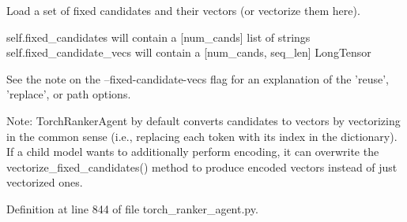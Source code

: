 \begin{DoxyVerb}Load a set of fixed candidates and their vectors (or vectorize them here).

self.fixed_candidates will contain a [num_cands] list of strings
self.fixed_candidate_vecs will contain a [num_cands, seq_len] LongTensor

See the note on the --fixed-candidate-vecs flag for an explanation of the
'reuse', 'replace', or path options.

Note: TorchRankerAgent by default converts candidates to vectors by vectorizing
in the common sense (i.e., replacing each token with its index in the
dictionary). If a child model wants to additionally perform encoding, it can
overwrite the vectorize_fixed_candidates() method to produce encoded vectors
instead of just vectorized ones.
\end{DoxyVerb}
 

Definition at line 844 of file torch\+\_\+ranker\+\_\+agent.\+py.


